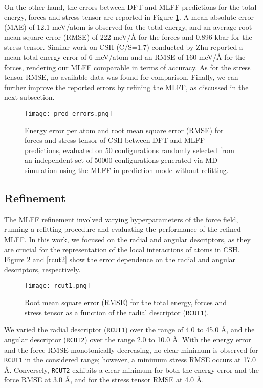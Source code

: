 On the other hand, the errors between DFT and MLFF predictions for the total energy, forces and stress tensor are reported in Figure \ref{pred-errors}. A mean absolute error (MAE) of 12.1 meV/atom is observed for the total energy, and an average root mean square error (RMSE) of 222 meV/Å for the forces and 0.896 kbar for the stress tensor. Similar work on CSH (C/S=1.7) conducted by Zhu \supercite{Zhu2024} reported a mean total energy error of 6 meV/atom and an RMSE of 160 meV/Å for the forces, rendering our MLFF comparable in terms of accuracy. As for the stress tensor RMSE, no available data was found for comparison. Finally, we can further improve the reported errors by refining the MLFF, as discussed in the next subsection.

\begin{figure}[h]
    \centering
    \texttt{[image: pred-errors.png]}
    \caption{
    Energy error per atom and root mean square error (RMSE) for forces and stress tensor of CSH between DFT and MLFF predictions, evaluated on 50 configurations randomly selected from an independent set of 50000 configurations generated via MD simulation using the MLFF in prediction mode without refitting. 
    }
    \label{pred-errors}
\end{figure}

\subsection{Refinement}
The MLFF refinement involved varying hyperparameters of the force field, running a refitting procedure and evaluating the performance of the refined MLFF. In this work, we focused on the radial and angular descriptors, as they are crucial for the representation of the local interactions of atoms in CSH. Figure \ref{rcut1} and \ref{rcut2} show the error dependence on the radial and angular descriptors, respectively. 

\begin{figure}[h]
    \centering
    \texttt{[image: rcut1.png]}
    \caption{
    Root mean square error (RMSE) for the total energy, forces and stress tensor as a function of the radial descriptor (\texttt{RCUT1}). 
    }
    \label{rcut1}
\end{figure}
We varied the radial descriptor (\texttt{RCUT1}) over the range of 4.0 to 45.0 Å, and the angular descriptor (\texttt{RCUT2}) over the range 2.0 to 10.0 Å. With the energy error and the force RMSE monotonically decreasing, no clear minimum is observed for \texttt{RCUT1} in the considered range; however, a minimum stress RMSE occurs at 17.0 \AA. Conversely, \texttt{RCUT2} exhibits a clear minimum for both the energy error and the force RMSE at 3.0 \AA, and for the stress tensor RMSE at 4.0 \AA.

